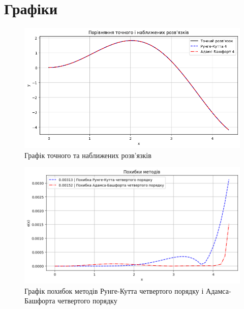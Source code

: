 \documentclass{article}
\begin{document}
    \newpage
    \section{Графіки}
        \begin{figure}[h!]
            \centering
            \includegraphics[scale=0.5]{compare.png}
            \caption{Графік точного та наближених розв’язків}
        \end{figure}

        \begin{figure}[h!]
            \centering
            \includegraphics[scale=0.5]{error.png}
            \caption{Графік похибок методів Рунге-Кутта четвертого порядку і Адамса-Башфорта четвертого порядку}
        \end{figure}

    \newpage
\end{document}
